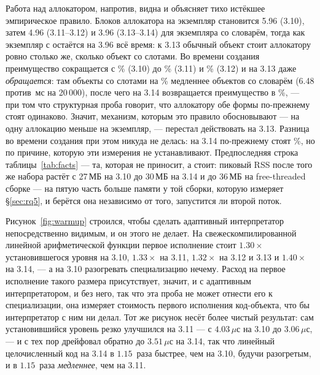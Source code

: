 Работа над аллокатором, напротив, видна и объясняет тихо истёкшее эмпирическое правило. Блоков
аллокатора на экземпляр становится 5.96 (3.10), затем 4.96 (3.11--3.12) и 3.96 (3.13--3.14) для
экземпляра со словарём, тогда как экземпляр с  остаётся на 3.96 всё время: к
3.13 обычный объект стоит аллокатору ровно столько же, сколько объект со слотами. Во времени
создания преимущество  сокращается с \% (3.10) до \% (3.11) и \% (3.12) и
на 3.13 даже \emph{обращается}: там объекты со слотами на \% медленнее объектов со словарём (6.48
против \,мс на 20\,000), после чего на 3.14 возвращается преимущество в \%, --- при том что
структурная проба говорит, что аллокатору обе формы по-прежнему стоят одинаково. Значит, механизм,
которым это правило обосновывают --- на одну аллокацию меньше на экземпляр, --- перестал
действовать на 3.13. Разница во времени создания при этом никуда не делась: на 3.14
 по-прежнему стоят \%, но по причине, которую эти измерения не устанавливают.
Предпоследняя строка таблицы~\ref{tab:facts} --- та, которая не приносит, а стоит:
пиковый RSS после того же набора растёт с 27\,МБ на 3.10 до 30\,МБ на 3.14 и до 36\,МБ на
free-threaded сборке --- на пятую часть больше памяти у той сборки, которую измеряет
\S\ref{sec:rq5}, и берётся она независимо от того, запустится ли второй поток.

Рисунок~\ref{fig:warmup} строился, чтобы сделать адаптивный интерпретатор непосредственно видимым,
и он этого не делает. На свежескомпилированной линейной арифметической функции первое исполнение
стоит $1.30\times$ установившегося уровня на 3.10, $1.33\times$ на 3.11, $1.32\times$ на 3.12 и
3.13 и $1.40\times$ на 3.14, --- а на 3.10 разогревать специализацию нечему. Расход на первое
исполнение такого размера присутствует, значит, и с адаптивным интерпретатором, и без него, так что
эта проба не может отнести его к специализации, она измеряет стоимость первого исполнения
код-объекта, что бы интерпретатор с ним ни делал. Тот же рисунок несёт более чистый результат: сам
установившийся уровень резко улучшился на 3.11 --- с $4.03\,\mu$с на 3.10 до $3.06\,\mu$с, --- и с
тех пор дрейфовал обратно до $3.51\,\mu$с на 3.14, так что линейный целочисленный код на 3.14 в
$1.15$~раза быстрее, чем на 3.10, будучи разогретым, и в $1.15$~раза \emph{медленнее}, чем на 3.11.

